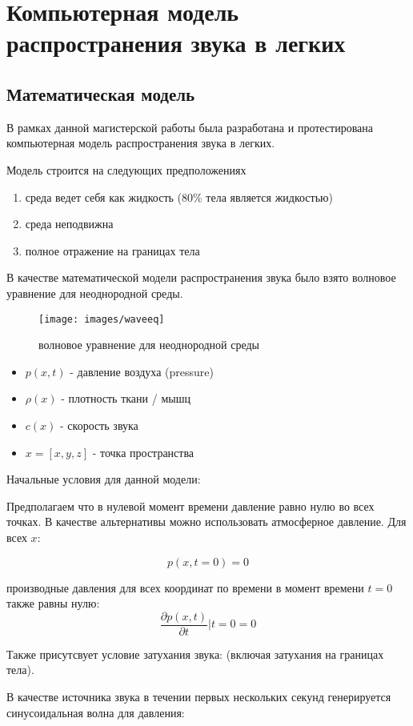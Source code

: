 \documentclass[../main.tex]{subfiles}
\begin{document}
\section{Компьютерная модель распространения звука в легких}
\subsection{Математическая модель}
В рамках данной магистерской работы была разработана и протестирована компьютерная модель распространения звука в легких.

Модель строится на следующих предположениях
\begin{enumerate}
    \item среда ведет себя как жидкость (80\% тела является жидкостью)
    \item среда неподвижна
    \item полное отражение на границах тела
\end{enumerate}

В качестве математической модели распространения звука было взято волновое уравнение для неоднородной среды.

\begin{figure}[H]
\centering
\texttt{[image: images/waveeq]}
\caption{волновое уравнение для неоднородной среды}
\end{figure}

\begin{itemize}
    \item $p(x, t)$ - давление воздуха (pressure)
    \item $\rho(x)$ - плотность ткани / мышц
    \item $c(x)$ - скорость звука
    \item $x = [x, y, z]$ - точка пространства
\end{itemize}

Начальные условия для данной модели:

Предполагаем что в нулевой момент времени давление равно нулю во всех точках. В качестве альтернативы можно использовать атмосферное давление. Для всех $x$:

$$p(x, t=0) = 0$$

производные давления для всех координат по времени в момент времени $t=0$ также равны нулю:
$$\frac{\partial p(x, t)}{\partial t} \rvert t=0 = 0$$

Также присутсвует условие затухания звука: (включая затухания на границах тела).

В качестве источника звука в течении первых нескольких секунд генерируется синусоидальная волна для давления:
\end{document}
